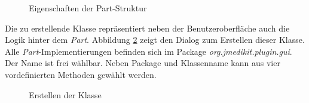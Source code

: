 \begin{figure}[H]
  \vspace{0.5cm}
  \centering
   \caption{Eigenschaften der Part-Struktur}
  \label{partpart}
  \vspace{0.5cm}
\end{figure}

Die zu erstellende Klasse repräsentiert neben der Benutzeroberfläche auch die Logik hinter dem \textit{Part}. Abbildung \ref{partclass} zeigt den Dialog zum Erstellen dieser Klasse. Alle \textit{Part}-Implementierungen befinden sich im Package \textit{org.jmedikit.plugin.gui}. Der Name ist frei wählbar. Neben Package und Klassenname kann aus vier vordefinierten Methoden gewählt werden.

\begin{figure}[H]
  \vspace{0.5cm}
  \centering
   \caption{Erstellen der Klasse}
  \label{partclass}
  \vspace{0.5cm}
\end{figure}


